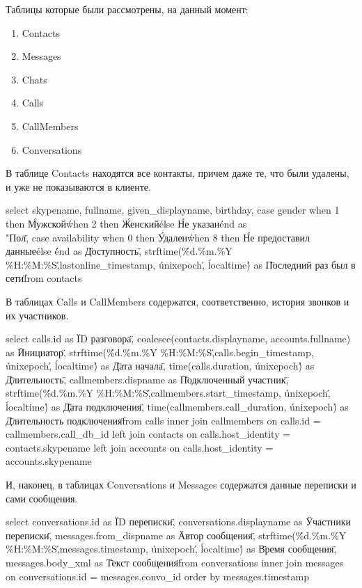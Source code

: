 Таблицы которые были рассмотрены, на данный момент:    
 \begin{enumerate}
\item Contacts
\item Messages
\item Chats
\item Calls
\item CallMembers
\item Conversations
\end{enumerate}

В таблице Contacts находятся все контакты, причем даже те, что были удалены, и уже не показываются в клиенте.

select skypename, 
       fullname, 
       given_displayname, 
       birthday, 
       case gender when 1 then \'Мужской\' when 2 then \'Женский\' else \'Не указан\' end as \\"Пол\", 
       case availability when 0 then \'Удален\' when 8 then \'Не предоставил данные\' else \'\' end as \"Доступность\",
       strftime(\'\%d.\%m.\%Y \%H:\%M:\%S\',lastonline_timestamp, \'unixepoch\', \'localtime\') as \"Последний раз был в сети\"
  from contacts



В таблицах Calls и CallMembers содержатся, соответственно, история звонков и их участников.

select calls.id as \"ID разговора\",
       coalesce(contacts.displayname, accounts.fullname) as \"Инициатор\",
       strftime(\'\%d.\%m.\%Y \%H:\%M:\%S\',calls.begin_timestamp, \'unixepoch\', \'localtime\') as \"Дата начала\",
       time(calls.duration, \'unixepoch\') as \"Длительность\",
       callmembers.dispname as \"Подключенный участник\",
       strftime(\'\%d.\%m.\%Y \%H:\%M:\%S\',callmembers.start_timestamp, \'unixepoch\', \'localtime\') as \"Дата подключения\",
       time(callmembers.call_duration, \'unixepoch\') as \"Длительность подключения\"
  from calls
       inner join callmembers on calls.id = callmembers.call_db_id
       left  join contacts on calls.host_identity = contacts.skypename
       left  join accounts on calls.host_identity = accounts.skypename



И, наконец, в таблицах Conversations и Messages содержатся данные переписки и сами сообщения.

select conversations.id as \"ID переписки\", 
       conversations.displayname as \"Участники переписки\", 
       messages.from_dispname as \"Автор сообщения\",  
       strftime(\'\%d.\%m.\%Y \%H:\%M:\%S\',messages.timestamp, \'unixepoch\', \'localtime\') as \"Время сообщения\", 
       messages.body_xml as \"Текст сообщения\"
  from conversations
       inner join messages on conversations.id = messages.convo_id
order by messages.timestamp



